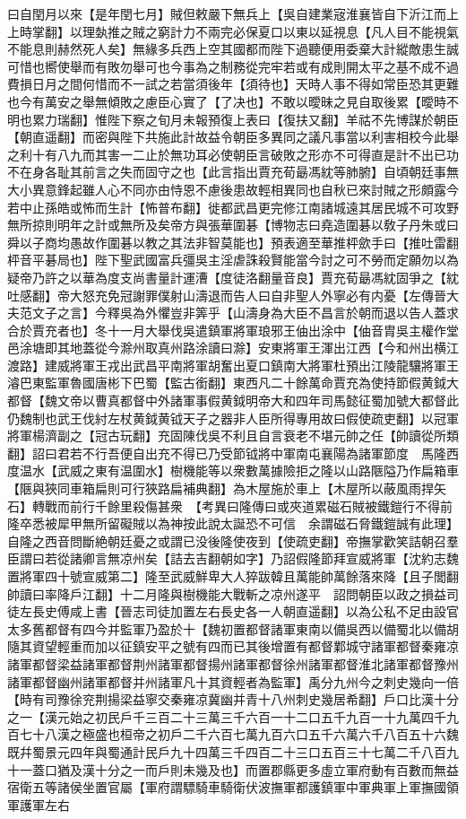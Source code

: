 曰自閏月以來【是年閏七月】賊但敕嚴下無兵上【吳自建業宼淮襄皆自下沂江而上上時掌翻】以理埶推之賊之窮計力不兩完必保夏口以東以延視息【凡人目不能視氣不能息則赫然死人矣】無緣多兵西上空其國都而陛下過聽便用委棄大計縱敵患生誠可惜也嚮使舉而有敗勿舉可也今事為之制務從完牢若或有成則開太平之基不成不過費損日月之間何惜而不一試之若當須後年【須待也】天時人事不得如常臣恐其更難也今有萬安之舉無傾敗之慮臣心實了【了决也】不敢以曖昧之見自取後累【曖時不明也累力瑞翻】惟陛下察之旬月未報預復上表曰【復扶又翻】羊祜不先博謀於朝臣【朝直遥翻】而密與陛下共施此計故益令朝臣多異同之議凡事當以利害相校今此舉之利十有八九而其害一二止於無功耳必使朝臣言破敗之形亦不可得直是計不出已功不在身各耻其前言之失而固守之也【此言指出賈充荀朂馮紞等肺腑】自頃朝廷事無大小異意鋒起雖人心不同亦由恃恩不慮後患故輕相異同也自秋已來討賊之形頗露今若中止孫皓或怖而生計【怖普布翻】徙都武昌更完修江南諸城遠其居民城不可攻野無所掠則明年之計或無所及矣帝方與張華圍碁【博物志曰堯造圍碁以敎子丹朱或曰舜以子商均愚故作圍碁以教之其法非智莫能也】預表適至華推枰歛手曰【推吐雷翻枰音平碁局也】陛下聖武國富兵彊吳主淫虐誅殺賢能當今討之可不勞而定願勿以為疑帝乃許之以華為度支尚書量計運漕【度徒洛翻量音良】賈充荀朂馮紞固爭之【紞吐感翻】帝大怒充免冠謝罪僕射山濤退而告人曰自非聖人外寧必有内憂【左傳晉大夫范文子之言】今釋吳為外懼豈非筭乎【山濤身為大臣不昌言於朝而退以告人蓋求合於賈充者也】冬十一月大舉伐吳遣鎮軍將軍琅邪王伷出涂中【伷音胄吳主權作堂邑涂塘即其地蓋從今滁州取真州路涂讀曰滁】安東將軍王渾出江西【今和州出横江渡路】建威將軍王戎出武昌平南將軍胡奮出夏口鎮南大將軍杜預出江陵龍驤將軍王濬巴東監軍魯國唐彬下巴蜀【監古銜翻】東西凡二十餘萬命賈充為使持節假黄鉞大都督【魏文帝以曹真都督中外諸軍事假黄鉞明帝大和四年司馬懿征蜀加號大都督此仍魏制也武王伐紂左杖黄鉞黄钺天子之器非人臣所得專用故曰假使疏吏翻】以冠軍將軍楊濟副之【冠古玩翻】充固陳伐吳不利且自言衰老不堪元帥之任【帥讀從所類翻】詔曰君若不行吾便自出充不得已乃受節钺將中軍南屯襄陽為諸軍節度　馬隆西度温水【武威之東有温圍水】樹機能等以衆數萬據險拒之隆以山路陿隘乃作扁箱車【陿與狹同車箱扁則可行狹路扁補典翻】為木屋施於車上【木屋所以蔽風雨捍矢石】轉戰而前行千餘里殺傷甚衆　【考異曰隆傳曰或夾道累磁石賊被鐵鎧行不得前隆卒悉被犀甲無所留礙賊以為神按此說太誕恐不可信　余謂磁石脅鐵鎧誠有此理】自隆之西音問斷絶朝廷憂之或謂已没後隆使夜到【使疏吏翻】帝撫掌歡笑詰朝召羣臣謂曰若從諸卿言無凉州矣【詰去吉翻朝如字】乃詔假隆節拜宣威將軍【沈約志魏置將軍四十號宣威第二】隆至武威鮮卑大人猝跋韓且萬能帥萬餘落來降【且子閭翻帥讀曰率降戶江翻】十二月隆與樹機能大戰斬之凉州遂平　詔問朝臣以政之損益司徒左長史傅咸上書【晉志司徒加置左右長史各一人朝直遥翻】以為公私不足由設官太多舊都督有四今并監軍乃盈於十【魏初置都督諸軍東南以備吳西以備蜀北以備胡隨其資望輕重而加以征鎮安平之號有四而已其後增置有都督鄴城守諸軍都督秦雍凉諸軍都督梁益諸軍都督荆州諸軍都督揚州諸軍都督徐州諸軍都督淮北諸軍都督豫州諸軍都督幽州諸軍都督并州諸軍凡十其資輕者為監軍】禹分九州今之刺史幾向一倍【時有司豫徐兖荆揚梁益寧交秦雍凉冀幽并青十八州刺史幾居希翻】戶口比漢十分之一【漢元始之初民戶千三百二十三萬三千六百一十二口五千九百一十九萬四千九百七十八漢之極盛也桓帝之初戶二千六百七萬九百六口五千六萬六千八百五十六魏既幷蜀景元四年與蜀通計民戶九十四萬三千四百二十三口五百三十七萬二千八百九十一蓋口猶及漢十分之一而戶則未幾及也】而置郡縣更多虛立軍府動有百數而無益宿衛五等諸侯坐置官屬【軍府謂驃騎車騎衛伏波撫軍都護鎮軍中軍典軍上軍撫國領軍護軍左右